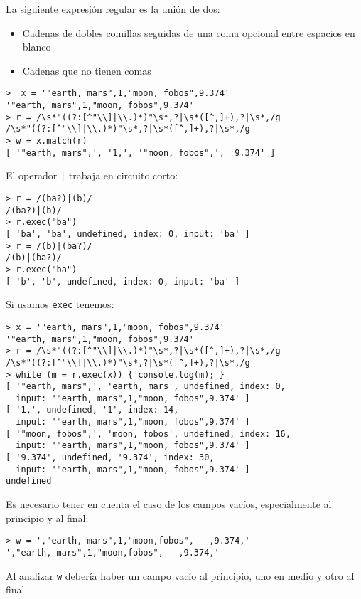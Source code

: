 La siguiente expresión regular es la unión de dos: 
\begin{itemize}
\item
Cadenas de dobles comillas seguidas de una coma opcional entre espacios en blanco
\item
Cadenas que no tienen comas
\end{itemize}
\begin{verbatim}
>  x = '"earth, mars",1,"moon, fobos",9.374'
'"earth, mars",1,"moon, fobos",9.374'
> r = /\s*"((?:[^"\\]|\\.)*)"\s*,?|\s*([^,]+),?|\s*,/g
/\s*"((?:[^"\\]|\\.)*)"\s*,?|\s*([^,]+),?|\s*,/g
> w = x.match(r)
[ '"earth, mars",', '1,', '"moon, fobos",', '9.374' ]
\end{verbatim}
El operador \verb#|# trabaja en circuito corto:
\begin{verbatim}
> r = /(ba?)|(b)/
/(ba?)|(b)/
> r.exec("ba")
[ 'ba', 'ba', undefined, index: 0, input: 'ba' ]
> r = /(b)|(ba?)/
/(b)|(ba?)/
> r.exec("ba")
[ 'b', 'b', undefined, index: 0, input: 'ba' ]
\end{verbatim}

Si usamos \verb|exec| tenemos:
\begin{verbatim}
> x = '"earth, mars",1,"moon, fobos",9.374'
'"earth, mars",1,"moon, fobos",9.374'
> r = /\s*"((?:[^"\\]|\\.)*)"\s*,?|\s*([^,]+),?|\s*,/g
/\s*"((?:[^"\\]|\\.)*)"\s*,?|\s*([^,]+),?|\s*,/g
> while (m = r.exec(x)) { console.log(m); }
[ '"earth, mars",', 'earth, mars', undefined, index: 0,
  input: '"earth, mars",1,"moon, fobos",9.374' ]
[ '1,', undefined, '1', index: 14,
  input: '"earth, mars",1,"moon, fobos",9.374' ]
[ '"moon, fobos",', 'moon, fobos', undefined, index: 16,
  input: '"earth, mars",1,"moon, fobos",9.374' ]
[ '9.374', undefined, '9.374', index: 30,
  input: '"earth, mars",1,"moon, fobos",9.374' ]
undefined
\end{verbatim}


Es necesario tener en cuenta el caso de los campos vacíos, especialmente al principio y al final:
\begin{verbatim}
> w = ',"earth, mars",1,"moon,fobos",   ,9.374,'
',"earth, mars",1,"moon,fobos",   ,9.374,'
\end{verbatim}
Al analizar \verb|w| debería haber un campo vacío al principio, uno en medio
y otro al final.

